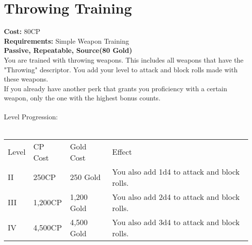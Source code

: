 \section{Throwing Training}\label{perk:throwingTraining}
\textbf{Cost:} 80CP\\
\textbf{Requirements:} Simple Weapon Training\\
\textbf{Passive, Repeatable, Source(80 Gold)}\\
You are trained with throwing weapons.
This includes all weapons that have the "Throwing" descriptor.
You add your level to attack and block rolls made with these weapons.\\
If you already have another perk that grants you proficiency with a certain weapon, only the one with the highest bonus counts.\\
\\
Level Progression:\\
\\
\begin{tabular}{l | l | l | l}
	Level & CP Cost & Gold Cost & Effect\\
	II & 250CP & 250 Gold & You also add 1d4 to attack and block rolls.\\
	III & 1,200CP & 1,200 Gold & You also add 2d4 to attack and block rolls.\\
	IV & 4,500CP & 4,500 Gold & You also add 3d4 to attack and block rolls.\\
\end{tabular}
